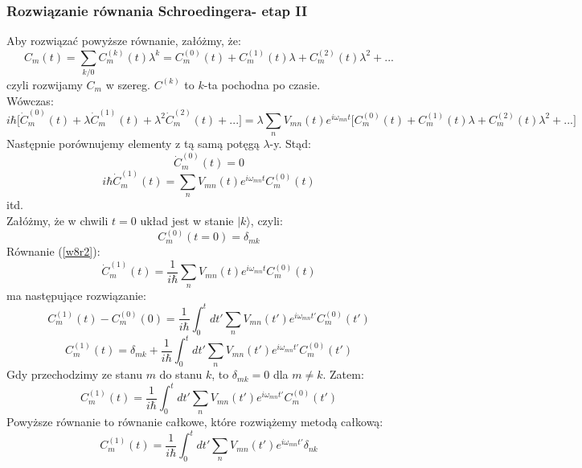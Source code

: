 \subsubsection{Rozwiązanie równania Schroedingera- etap II}
Aby rozwiązać powyższe równanie, załóżmy, że:
\begin{equation} C_m(t)=\sum_{k/0}C_m^{(k)}(t)\lambda^k =
C_m^{(0)}(t) + C_m^{(1)}(t)\lambda +C_m^{(2)}(t)\lambda^2+...
\end{equation}
czyli rozwijamy $C_m$ w szereg. $C^{(k)}$ to $k$-ta pochodna po czasie.\\
Wówczas:
\begin{equation} i\hbar\Big[\dot{C}_m^{(0)}(t)+\lambda\dot{C}_m^{(1)}(t)+\lambda^2\dot{C}_m^{(2)}(t)+...\Big] =
\lambda\sum_nV_{mn}(t)e^{i\omega_{mn}t}\Big[C_m^{(0)}(t) + C_m^{(1)}(t)\lambda +C_m^{(2)}(t)\lambda^2+...\Big]
\end{equation}
Następnie porównujemy elementy z tą samą potęgą $\lambda$-y. Stąd:
\begin{equation}\dot{C}_m^{(0)}(t)=0\end{equation}
\begin{equation}i\hbar\dot{C}_m^{(1)}(t)=\sum_nV_{mn}(t)e^{i\omega_{mn}t}C_m^{(0)}(t)
\label{w8r2}\end{equation}
itd.\\
Załóżmy, że w chwili $t=0$ układ jest w stanie $|k\rangle$, czyli:
\begin{equation}C_m^{(0)}(t=0)=\delta_{mk}\end{equation}
Równanie (\ref{w8r2}):
\begin{equation}\dot{C}_m^{(1)}(t)=\frac{1}{i\hbar}\sum_nV_{mn}(t)e^{i\omega_{mn}t}C_m^{(0)}(t)
\end{equation}
ma następujące rozwiązanie:
\begin{equation}{C}_m^{(1)}(t)-{C}_m^{(0)}(0)=\frac{1}{i\hbar}\int_0^t dt'\sum_nV_{mn}(t')e^{i\omega_{mn}t'}C_m^{(0)}(t')
\end{equation}
\begin{equation}{C}_m^{(1)}(t)=\delta_{mk}+\frac{1}{i\hbar}\int_0^t dt'\sum_nV_{mn}(t')e^{i\omega_{mn}t'}C_m^{(0)}(t')
\end{equation}
Gdy przechodzimy ze stanu $m$ do stanu $k$, to $\delta_{mk}=0$ dla $m\neq k$. Zatem:
\begin{equation}{C}_m^{(1)}(t)=\frac{1}{i\hbar}\int_0^t dt'\sum_nV_{mn}(t')e^{i\omega_{mn}t'}C_m^{(0)}(t')
\end{equation}
Powyższe równanie to równanie całkowe, które rozwiążemy metodą całkową:
\begin{equation}{C}_m^{(1)}(t)=\frac{1}{i\hbar}\int_0^t dt'\sum_nV_{mn}(t')e^{i\omega_{mn}t'}\delta_{nk}
\end{equation}
